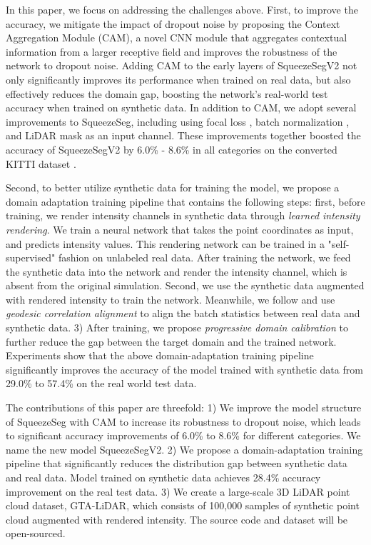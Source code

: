 \documentclass[letterpaper, 10 pt, conference]{ieeeconf}
\begin{document}
In this paper, we focus on addressing the challenges above. First, to improve the accuracy, we mitigate the impact of dropout noise by proposing the Context Aggregation Module (CAM), a novel CNN module that aggregates contextual information from a larger receptive field and improves the robustness of the network to dropout noise. Adding CAM to the early layers of SqueezeSegV2 not only significantly improves its performance when trained on real data, but also effectively reduces the domain gap, boosting the network's real-world test accuracy when trained on synthetic data. In addition to CAM, we adopt several improvements to SqueezeSeg, including using focal loss \cite{lin2018focal}, batch normalization \cite{ioffe2015batch}, and LiDAR mask as an input channel. These improvements together boosted the accuracy of SqueezeSegV2 by 6.0\% - 8.6\% in all categories on the converted KITTI dataset \cite{wu2017squeezeseg}. 

Second, to better utilize synthetic data for training the model, we propose a domain adaptation training pipeline that contains the following steps: first, before training, we render intensity channels in synthetic data through \textit{learned intensity rendering}. We train a neural network that takes the point coordinates as input, and predicts intensity values. This rendering network can be trained in a "self-supervised" fashion on unlabeled real data. After training the network, we feed the synthetic data into the network and render the intensity channel, which is absent from the original simulation. Second, we use the synthetic data augmented with rendered intensity to train the network. Meanwhile, we follow \cite{morerio2018minimal} and use \textit{geodesic correlation alignment} to align the batch statistics between real data and synthetic data. 3) After training, we propose \textit{progressive domain calibration} to further reduce the gap between the target domain and the trained network. Experiments show that the above domain-adaptation training pipeline significantly improves the accuracy of the model trained with synthetic data from 29.0\% to 57.4\% on the real world test data. 

The contributions of this paper are threefold: 1) We improve the model structure of SqueezeSeg with CAM to increase its robustness to dropout noise, which leads to significant accuracy improvements of 6.0\% to 8.6\% for different categories. We name the new model SqueezeSegV2. 2) We propose a domain-adaptation training pipeline that significantly reduces the distribution gap between synthetic data and real data. Model trained on synthetic data achieves 28.4\% accuracy improvement on the real test data. 3) We create a large-scale 3D LiDAR point cloud dataset, GTA-LiDAR, which consists of 100,000 samples of synthetic point cloud augmented with rendered intensity. The source code and dataset will be open-sourced. 
\end{document}
